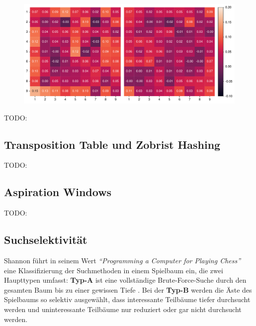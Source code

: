 \begin{figure}[!ht]
    \centering
    \begin{minipage}{.78\textwidth}
        \centering
        \includegraphics[width=\linewidth]{res/pictures/plots/special-action-ordering.pdf}
    \end{minipage}
    \label{fig:action-ordering-special-patch}
\end{figure}

TODO:

\subsection{Transposition Table und Zobrist Hashing}

TODO:

\subsection{Aspiration Windows}

TODO:

\cite{2003.AspirationWindows}
\cite{2024.StockfishBackoff}

\pagebreak

\subsection{Suchselektivität}

Shannon führt in seinem Wert \emph{\enquote{Programming a Computer for Playing Chess}} eine Klassifizierung der Suchmethoden in einem Spielbaum ein, die zwei Haupttypen umfasst: \textbf{Typ-A} ist eine vollständige Brute-Force-Suche durch den gesamten Baum bis zu einer gewissen Tiefe \cite[S. 8]{1950.ChessShannon}. Bei der \textbf{Typ-B} werden die Äste des Spielbaums so selektiv ausgewählt, dass interessante Teilbäume tiefer durchsucht werden und uninteressante Teilbäume nur reduziert oder gar nicht durchsucht werden.


